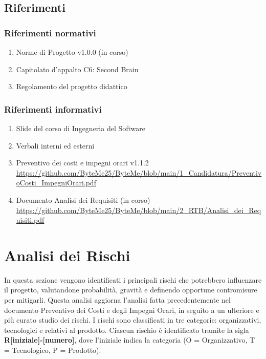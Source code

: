 \documentclass[11pt,a4paper]{article}
\begin{document}
\subsection{Riferimenti}
\subsubsection{Riferimenti normativi}
\begin{enumerate}
    \item Norme di Progetto v1.0.0 (in corso)
    \item Capitolato d’appalto C6: Second Brain
    \item Regolamento del progetto didattico
\end{enumerate}

\subsubsection{Riferimenti informativi}
\begin{enumerate}
    \item Slide del corso di Ingegneria del Software
    \item Verbali interni ed esterni
    \item Preventivo dei costi e impegni orari v1.1.2
    \url{https://github.com/ByteMe25/ByteMe/blob/main/1_Candidatura/PreventivoCosti_ImpegniOrari.pdf}
    \item Documento Analisi dei Requisiti (in corso)
    \url{https://github.com/ByteMe25/ByteMe/blob/main/2_RTB/Analisi_dei_Requisiti.pdf}
\end{enumerate}

\newpage

\section{Analisi dei Rischi}
In questa sezione vengono identificati i principali rischi che potrebbero influenzare il progetto, valutandone probabilità, gravità e definendo opportune contromisure per mitigarli. Questa analisi aggiorna l'analisi fatta precedentemente nel documento Preventivo dei Costi e degli Impegni Orari, in seguito a un ulteriore e più curato studio dei rischi.
I rischi sono classificati in tre categorie: organizzativi, tecnologici e relativi al prodotto. Ciascun rischio è identificato tramite la sigla \textbf{R[iniziale]-[numero]}, dove l'iniziale indica la categoria (O = Organizzativo, T = Tecnologico, P = Prodotto).
\end{document}
